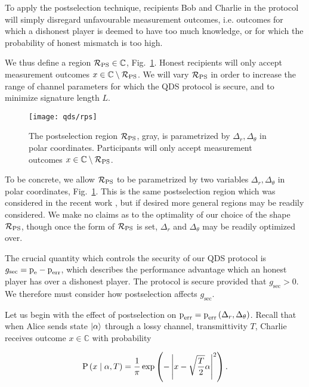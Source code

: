 To apply the postselection technique, recipients Bob and Charlie in the protocol will simply disregard unfavourable measurement outcomes, i.e. outcomes for which a dishonest player is deemed to have too much knowledge, or for which the probability of honest mismatch is too high.

We thus define a region $\mathcal{R}_{\text{PS}} \in \mathbb{C}$, Fig.~\ref{fig:rps}. Honest recipients will only accept measurement outcomes $x \in \mathbb{C}\setminus\mathcal{R}_{\text{PS}}$. We will vary $\mathcal{R}_{\text{PS}}$ in order to increase the range of channel parameters for which the QDS protocol is secure, and to minimize signature length $L$.

\begin{figure}[htp]
\centering
\texttt{[image: qds/rps]}
\caption{\label{fig:rps} The postselection region $\mathcal{R}_{\text{PS}}$, gray, is parametrized by $\Delta_r, \Delta_\theta$ in polar coordinates. Participants will only accept measurement outcomes $x \in \mathbb{C} \setminus \mathcal{R}_{\text{PS}}$. }
\end{figure}

To be concrete, we allow $\mathcal{R}_{\text{PS}}$ to be parametrized by two variables $\Delta_r, \Delta_\theta$ in polar coordinates, Fig.~\ref{fig:rps}. This is the same postselection region which was considered in the recent work , but if desired more general regions may be readily considered. We make no claims as to the optimality of our choice of the shape $\mathcal{R}_{\text{PS}}$, though once the form of $\mathcal{R}_{\text{PS}}$ is set, $\Delta_r$ and $\Delta_\theta$ may be readily optimized over.

The crucial quantity which controls the security of our QDS protocol is $g_{\text{sec}} = \text{p}_{\text{e}} - \text{p}_{\text{err}}$, which describes the performance advantage which an honest player has over a dishonest player. The protocol is secure provided that $g_{\text{sec}} > 0$. We therefore must consider how postselection affects $g_{\text{sec}}$. 

Let us begin with the effect of postselection on $\text{p}_{\text{err}} = \text{p}_{\text{err}}\left(\Delta_r, \Delta_\theta\right)$.  Recall that when Alice sends state $\ket{\alpha}$ through a lossy channel, transmittivity $T$, Charlie receives outcome $x \in \mathbb{C}$ with probability

\begin{equation}
\text{P}\left(x \; \middle| \; \alpha, T\right) = \frac{1}{\pi} \exp\left( - \left| x - \sqrt{\frac{T}{2}}\alpha\right|^2\right).
\end{equation}

